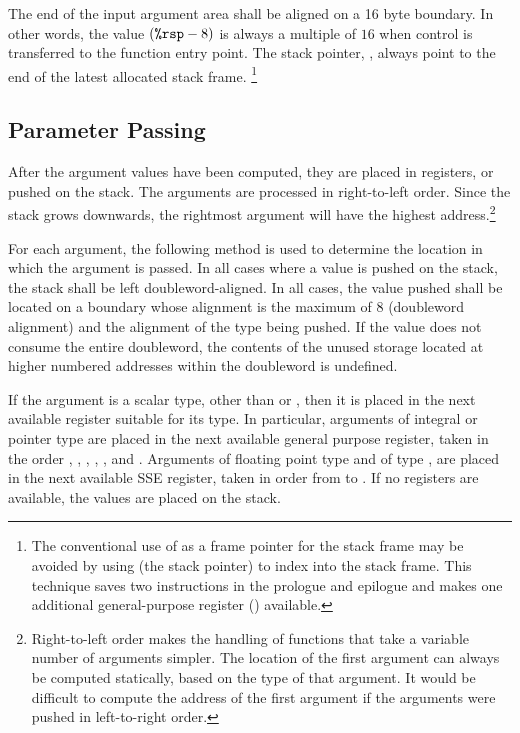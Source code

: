 The end of the input argument area shall be aligned on a 16 byte
boundary.  In other words, the value $({\texttt{\%rsp}} - 8)$ is always a multiple
of $16$ when control is transferred to the function entry point.  The
stack pointer, \RSP, always point to the end of the latest allocated
stack frame.  \footnote{The conventional use of \RBP{} as a frame
  pointer for the stack frame may be avoided by using \RSP (the stack
  pointer) to index into the stack frame.  This technique saves two
  instructions in the prologue and epilogue and makes one additional
  general-purpose register (\RSP) available.}

\subsection{Parameter Passing}

After the argument values have been computed, they are placed in
registers, or pushed on the stack.  The arguments are processed in
right-to-left order.  Since the stack grows downwards, the rightmost
argument will have the highest address.\footnote{Right-to-left order
  makes the handling of functions that take a variable number of
  arguments simpler.  The location of the first argument can always be
  computed statically, based on the type of that argument.  It would
  be difficult to compute the address of the first argument if the
  arguments were pushed in left-to-right order.}

For each argument, the following method is used to determine the
location in which the argument is passed.  In all cases where a value
is pushed on the stack, the stack shall be left doubleword-aligned.
In all cases, the value pushed shall be located on a boundary whose
alignment is the maximum of 8 (doubleword alignment) and the alignment
of the type being pushed.  If the value does not consume the entire
doubleword, the contents of the unused storage located at higher
numbered addresses within the doubleword is undefined.

If the argument is a scalar type, other than  or
, then it is placed in the next available register
suitable for its type.  In particular, arguments of integral or
pointer type are placed in the next available general purpose
register, taken in the order \RAX, \RDX, \RCX, \RBX, \RSI, and \RDI.
Arguments of floating point type and of type , are placed
in the next available SSE register, taken in order from  to
.  If no registers are available, the values are placed on
the stack.

